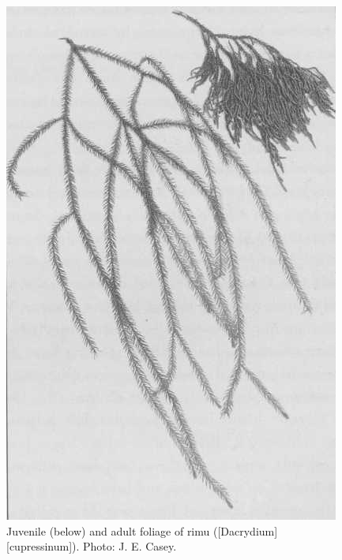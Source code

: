 \begin{figure}[htb]
	\centering
	\begin{minipage}[t]{0.475\textwidth}
		\centering
		\includegraphics[height=1.3\textwidth]{graphics/figure21rimu.jpg}
    	\caption[Rimu foliage]{Juvenile (below) and adult foliage of rimu ([Dacrydium][cupressinum]).
    	Photo: J. E. Casey.}%
    	\label{fig:21rimu}
	\end{minipage}\hfill%
	\begin{minipage}[t]{0.475\textwidth}
    	\centering

\end{minipage}
\end{figure}
